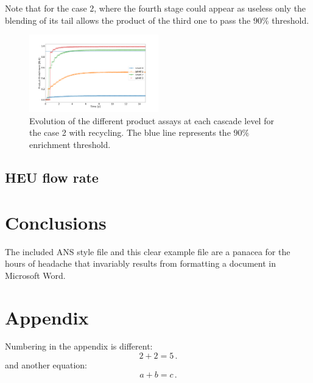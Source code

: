 \documentclass{anstrans}
\begin{document}
Note that for the case 2, where the fourth stage could appear as useless only the
blending of its tail allows the product of the third one to pass the $90\%$ threshold.

\begin{figure}[ht] %
  \centering
  \includegraphics[width=0.5\textwidth]{assay_case_2_rec.png}
  \caption{Evolution of the different product assays at each cascade level for
  the case 2 with recycling. The blue line represents the $90\%$ enrichment
  threshold.}\label{fig:assay_c2_r}
\end{figure}

\subsection{HEU flow rate}

\section{Conclusions}

The included ANS style file and this clear example file are a panacea for
the hours of headache that invariably results from formatting a document in
Microsoft Word.

\appendix
\section{Appendix}

Numbering in the appendix is different:
\begin{equation} \label{eq:appendix}
  2 + 2 = 5\,.
\end{equation}
and another equation:
\begin{equation} \label{eq:appendix2}
  a + b = c\,.
\end{equation}
\end{document}
